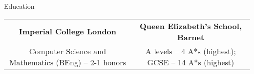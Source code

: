 \documentclass[10pt]{resume} %
\begin{document}

\begin{rSection}{Education}

  \begin{center}
  \begin{tabular}{ c c }
    {\bf Imperial College London} & {\bf Queen Elizabeth's School, Barnet} \\
    Computer Science and Mathematics (BEng) -- 2-1 honors &
    A levels -- 4 A*s (highest); GCSE -- 14 A*s (highest) \\
  \end{tabular}
  \end{center}

\end{rSection}

\end{document}
